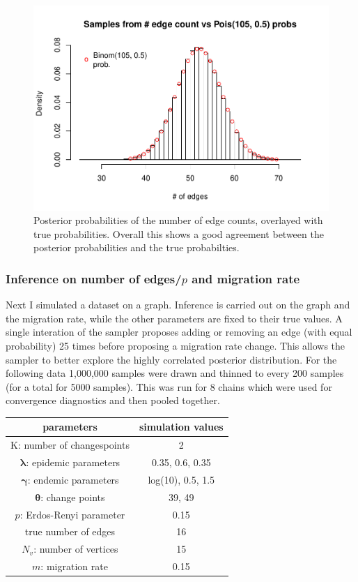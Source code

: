 \documentclass[11pt,a4paper]{article}
\numberwithin{equation}{section}
\begin{document}
\begin{figure}
\centering
\includegraphics{thesis_draft_files/figure-latex/unnamed-chunk-8-1.pdf}
\caption{\label{fig:binom_hist} Posterior probabilities of the number of
edge counts, overlayed with true probabilities. Overall this shows a
good agreement between the posterior probabilities and the true
probabilties.}
\end{figure}

\hypertarget{inference-on-number-of-edgesp-and-migration-rate}{%
\subsubsection{\texorpdfstring{Inference on number of edges/\(p\) and
migration
rate}{Inference on number of edges/p and migration rate}}\label{inference-on-number-of-edgesp-and-migration-rate}}

Next I simulated a dataset on a graph. Inference is carried out on the
graph and the migration rate, while the other parameters are fixed to
their true values. A single interation of the sampler proposes adding or
removing an edge (with equal probability) 25 times before proposing a
migration rate change. This allows the sampler to better explore the
highly correlated posterior distribution. For the following data
1,000,000 samples were drawn and thinned to every 200 samples (for a
total for 5000 samples). This was run for 8 chains which were used for
convergence diagnostics and then pooled together. \pagebreak

\begin{longtable}[]{@{}cc@{}}
\toprule
parameters & simulation values\tabularnewline
\midrule
\endhead
K: number of changespoints & 2\tabularnewline
\(\boldsymbol{\lambda}\): epidemic parameters & 0.35, 0.6,
0.35\tabularnewline
\(\boldsymbol{\gamma}\): endemic parameters & log(10), 0.5,
1.5\tabularnewline
\(\boldsymbol{\theta}\): change points & 39, 49\tabularnewline
\(p\): Erdos-Renyi parameter & 0.15\tabularnewline
true number of edges & 16\tabularnewline
\(N_v\): number of vertices & 15\tabularnewline
\(m\): migration rate & 0.15\tabularnewline
\bottomrule
\end{longtable}
\end{document}
